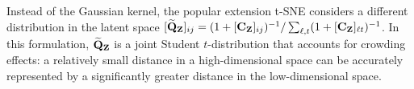 Instead of the Gaussian kernel, the popular extension t-SNE \citep{van2008visualizing} considers a different distribution in the latent space $[\widetilde{\mathbf{Q}}_{\mathbf{Z}}]_{ij} = (1 + [\mathbf{C}_{\mathbf{Z}}]_{ij})^{-1}/\sum_{\ell,t}(1 +
[\mathbf{C}_{\mathbf{Z}}]_{\ell t})^{-1}$. In this formulation, $\widetilde{\mathbf{Q}}_{\mathbf{Z}}$ is a joint
Student $t$-distribution that accounts for crowding effects: a relatively small
distance in a high-dimensional space can be accurately represented by a
significantly greater distance in the low-dimensional space.  